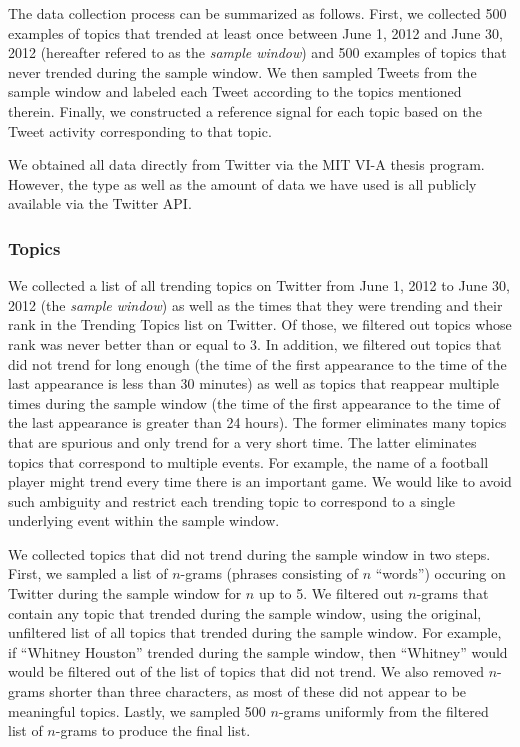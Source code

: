 The data collection process can be summarized as follows. First, we collected
500 examples of topics that trended at least once between June 1, 2012 and June
30, 2012 (hereafter refered to as the {\em sample window}) and 500 examples of
topics that never trended during the sample window. We then sampled Tweets from the
sample window and labeled each Tweet according to the topics mentioned
therein. Finally, we constructed a reference signal for each topic based on the
Tweet activity corresponding to that topic.

We obtained all data directly from Twitter via the MIT VI-A thesis
program. However, the type as well as the amount of data we have used is all
publicly available via the Twitter API.

\subsubsection{Topics}
We collected a list of all trending topics on Twitter from June 1, 2012 to June
30, 2012 (the {\em sample window}) as well as the times that they were trending
and their rank in the Trending Topics list on Twitter. Of those, we filtered out
topics whose rank was never better than or equal to 3. In addition, we filtered
out topics that did not trend for long enough (the time of the first appearance
to the time of the last appearance is less than 30 minutes) as well as topics
that reappear multiple times during the sample window (the time of the first
appearance to the time of the last appearance is greater than 24 hours). The
former eliminates many topics that are spurious and only trend for a very short
time. The latter eliminates topics that correspond to multiple events. For
example, the name of a football player might trend every time there is an
important game. We would like to avoid such ambiguity and restrict each trending
topic to correspond to a single underlying event within the sample window.

We collected topics that did not trend during the sample window in two
steps. First, we sampled a list of $n$-grams (phrases consisting of $n$
``words'') occuring on Twitter during the sample window for $n$ up to 5. We
filtered out $n$-grams that contain any topic that trended during the sample
window, using the original, unfiltered list of all topics that trended during
the sample window. For example, if ``Whitney Houston'' trended during the sample
window, then ``Whitney'' would would be filtered out of the list of topics that
did not trend. We also removed $n$-grams shorter than three characters, as most
of these did not appear to be meaningful topics. Lastly, we sampled 500
$n$-grams uniformly from the filtered list of $n$-grams to produce the final
list.

